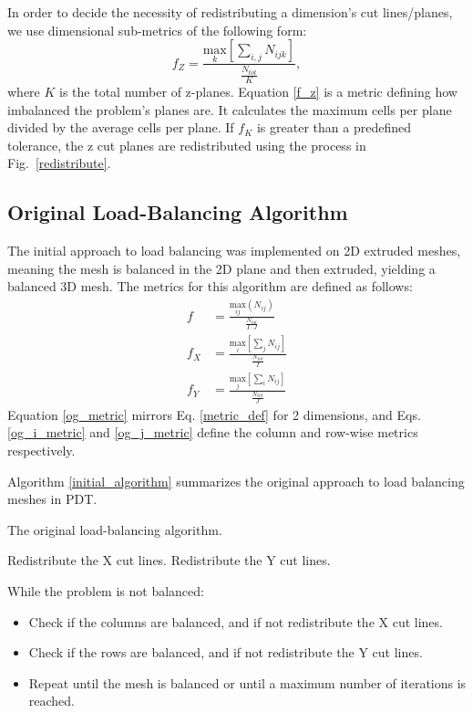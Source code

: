 \documentclass[times,final]{elsarticle}
\begin{document}
In order to decide the necessity of redistributing a dimension's cut lines/planes, we use dimensional sub-metrics of the following form:
\begin{equation}
f_{Z} = \frac{\underset{k}{\text{max}}[\sum_{i,j} N_{ijk}]}{\frac{N_{tot}}{K}},
\label{f_z}
\end{equation}
where $K$ is the total number of z-planes.
Equation \ref{f_z} is a metric defining how imbalanced the problem's planes are. It calculates the maximum cells per plane divided by the average cells per plane. If $f_K$ is greater than a predefined tolerance, the z cut planes are redistributed using the process in Fig.~\ref{redistribute}.

\subsection{Original Load-Balancing Algorithm}
\label{sec:og_lb}

The initial approach to load balancing was implemented on 2D extruded meshes, meaning the mesh is balanced in the 2D plane and then extruded, yielding a balanced 3D mesh. The metrics for this algorithm are defined as follows:
\begin{align}
f &= \frac{\underset{ij}{\text{max}}(N_{ij})}{\frac{N_{tot}}{I\cdot J}}  \label{og_metric}\\
f_X &= \frac{\underset{i}{\text{max}}[\sum_{j} N_{ij}] } {\frac{N_{tot}}{I}} \label{og_i_metric} \\
f_Y &= \frac{\underset{j}{\text{max}}[\sum_{i} N_{ij}] } {\frac{N_{tot}}{J}} \label{og_j_metric}
\end{align}
Equation \ref{og_metric} mirrors Eq. \ref{metric_def} for 2 dimensions, and Eqs. \ref{og_i_metric} and \ref{og_j_metric} define the column and row-wise metrics respectively.

 Algorithm \ref{initial_algorithm} summarizes the original approach to load balancing meshes in PDT.
\begin{algorithm}[H]
\caption{The original load-balancing algorithm.}
\label{initial_algorithm}
\begin{algorithmic}

    \STATE Redistribute the X cut lines.
  \ENDIF
  	\STATE Redistribute the Y cut lines.
  \ENDIF
\ENDWHILE
\end{algorithmic}
\end{algorithm}
While the problem is not balanced:
\begin{itemize}
  \item Check if the columns are balanced, and if not redistribute the X cut lines.
  \item Check if the rows are balanced, and if not redistribute the Y cut lines.
  \item Repeat until the mesh is balanced or until a maximum number of iterations is reached.
\end{itemize}
\end{document}
